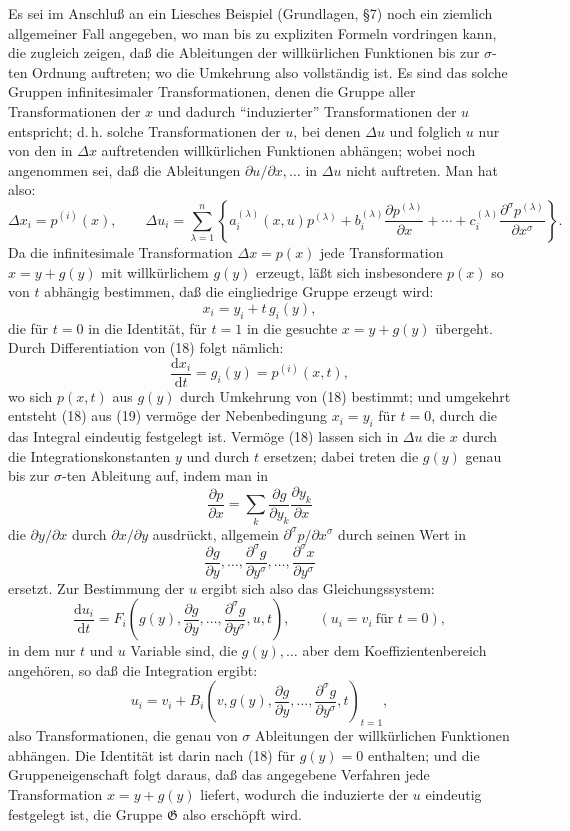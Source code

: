 \documentclass[11pt]{article}
\newcommand{\D}{\Delta}
\providecommand{\dd}{\mathrm d}
\providecommand{\G}{\mathfrak G}
\providecommand{\p}{\partial}
\providecommand{\p}{\partial}
\providecommand{\dd}{\mathrm d}
\begin{document}
Es sei im Anschluß an ein Liesches Beispiel (Grundlagen, \S{}7) noch ein ziemlich allgemeiner Fall angegeben, wo man bis zu expliziten Formeln vordringen kann, die zugleich zeigen, daß die Ableitungen der willkürlichen Funktionen bis zur \(\sigma\)-ten Ordnung auftreten; wo die Umkehrung also vollständig ist. Es sind das solche Gruppen infinitesimaler Transformationen, denen die Gruppe aller Transformationen der \(x\) und dadurch ``induzierter'' Transformationen der \(u\) entspricht; d.\,h. solche Transformationen der \(u\), bei denen \(\D u\) und folglich \(u\) nur von den in \(\D x\) auftretenden willkürlichen Funktionen abhängen; wobei noch angenommen sei, daß die Ableitungen \(\p u/\p x,\ldots\) in \(\D u\) nicht auftreten. Man hat also:
\[
\D x_i=p^{(i)}(x),\qquad
\D u_i=
\sum_{\lambda=1}^{n}\left\{
a_i^{(\lambda)}(x,u)p^{(\lambda)}
+b_i^{(\lambda)}\frac{\p p^{(\lambda)}}{\p x}
+\cdots+
c_i^{(\lambda)}\frac{\p^\sigma p^{(\lambda)}}{\p x^\sigma}
\right\}.
\]
Da die infinitesimale Transformation \(\D x=p(x)\) jede Transformation \(x=y+g(y)\) mit willkürlichem \(g(y)\) erzeugt, läßt sich insbesondere \(p(x)\) so von \(t\) abhängig bestimmen, daß die eingliedrige Gruppe erzeugt wird:
\begin{equation}
x_i=y_i+t\,g_i(y),
\tag{18}
\end{equation}
die für \(t=0\) in die Identität, für \(t=1\) in die gesuchte \(x=y+g(y)\) übergeht. Durch Differentiation von (18) folgt nämlich:
\begin{equation}
\frac{\dd x_i}{\dd t}=g_i(y)=p^{(i)}(x,t),
\tag{19}
\end{equation}
wo sich \(p(x,t)\) aus \(g(y)\) durch Umkehrung von (18) bestimmt; und umgekehrt entsteht (18) aus (19) vermöge der Nebenbedingung \(x_i=y_i\) für \(t=0\), durch die das Integral eindeutig festgelegt ist. Vermöge (18) lassen sich in \(\D u\) die \(x\) durch die Integrationskonstanten \(y\) und durch \(t\) ersetzen; dabei treten die \(g(y)\) genau bis zur \(\sigma\)-ten Ableitung auf, indem man in
\[
\frac{\p p}{\p x}=\sum_k\frac{\p g}{\p y_k}\frac{\p y_k}{\p x}
\]
die \(\p y/\p x\) durch \(\p x/\p y\) ausdrückt, allgemein \(\p^\sigma p/\p x^\sigma\) durch seinen Wert in
\[
\frac{\p g}{\p y},\ldots,\frac{\p^\sigma g}{\p y^\sigma},\ldots,\frac{\p^\sigma x}{\p y^\sigma}
\]
ersetzt. Zur Bestimmung der \(u\) ergibt sich also das Gleichungssystem:
\[
\frac{\dd u_i}{\dd t}
=
F_i\!\left(g(y),\frac{\p g}{\p y},\ldots,\frac{\p^\sigma g}{\p y^\sigma},u,t\right),
\qquad (u_i=v_i\ \text{für }t=0),
\]
in dem nur \(t\) und \(u\) Variable sind, die \(g(y),\ldots\) aber dem Koeffizientenbereich angehören, so daß die Integration ergibt:
\[
u_i=v_i+
B_i\!\left(v,g(y),\frac{\p g}{\p y},\ldots,\frac{\p^\sigma g}{\p y^\sigma},t\right)_{t=1},
\]
also Transformationen, die genau von \(\sigma\) Ableitungen der willkürlichen Funktionen abhängen. Die Identität ist darin nach (18) für \(g(y)=0\) enthalten; und die Gruppeneigenschaft folgt daraus, daß das angegebene Verfahren jede Transformation \(x=y+g(y)\) liefert, wodurch die induzierte der \(u\) eindeutig festgelegt ist, die Gruppe \(\G\) also erschöpft wird.
\end{document}
